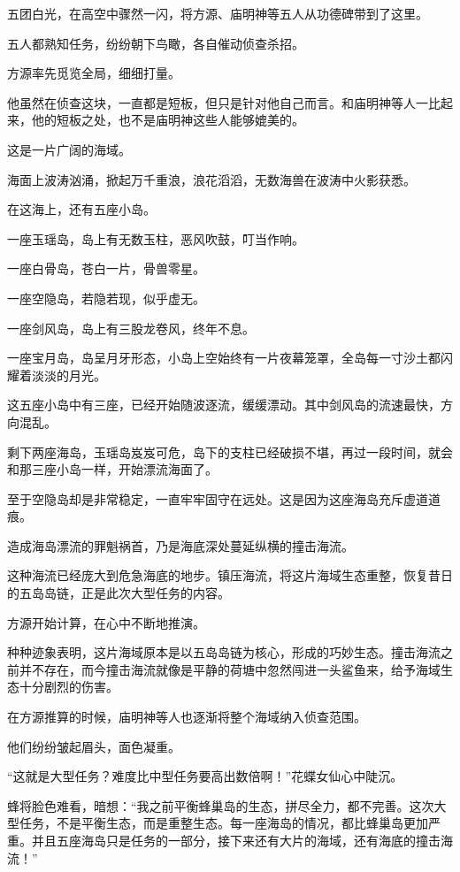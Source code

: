 
\begin{this_body}

五团白光，在高空中骤然一闪，将方源、庙明神等五人从功德碑带到了这里。

五人都熟知任务，纷纷朝下鸟瞰，各自催动侦查杀招。

方源率先觅览全局，细细打量。

他虽然在侦查这块，一直都是短板，但只是针对他自己而言。和庙明神等人一比起来，他的短板之处，也不是庙明神这些人能够媲美的。

这是一片广阔的海域。

海面上波涛汹涌，掀起万千重浪，浪花滔滔，无数海兽在波涛中火影获悉。

在这海上，还有五座小岛。

一座玉瑶岛，岛上有无数玉柱，恶风吹鼓，叮当作响。

一座白骨岛，苍白一片，骨兽零星。

一座空隐岛，若隐若现，似乎虚无。

一座剑风岛，岛上有三股龙卷风，终年不息。

一座宝月岛，岛呈月牙形态，小岛上空始终有一片夜幕笼罩，全岛每一寸沙土都闪耀着淡淡的月光。

这五座小岛中有三座，已经开始随波逐流，缓缓漂动。其中剑风岛的流速最快，方向混乱。

剩下两座海岛，玉瑶岛岌岌可危，岛下的支柱已经破损不堪，再过一段时间，就会和那三座小岛一样，开始漂流海面了。

至于空隐岛却是非常稳定，一直牢牢固守在远处。这是因为这座海岛充斥虚道道痕。

造成海岛漂流的罪魁祸首，乃是海底深处蔓延纵横的撞击海流。

这种海流已经庞大到危急海底的地步。镇压海流，将这片海域生态重整，恢复昔日的五岛岛链，正是此次大型任务的内容。

方源开始计算，在心中不断地推演。

种种迹象表明，这片海域原本是以五岛岛链为核心，形成的巧妙生态。撞击海流之前并不存在，而今撞击海流就像是平静的荷塘中忽然闯进一头鲨鱼来，给予海域生态十分剧烈的伤害。

在方源推算的时候，庙明神等人也逐渐将整个海域纳入侦查范围。

他们纷纷皱起眉头，面色凝重。

“这就是大型任务？难度比中型任务要高出数倍啊！”花蝶女仙心中陡沉。

蜂将脸色难看，暗想：“我之前平衡蜂巢岛的生态，拼尽全力，都不完善。这次大型任务，不是平衡生态，而是重整生态。每一座海岛的情况，都比蜂巢岛更加严重。并且五座海岛只是任务的一部分，接下来还有大片的海域，还有海底的撞击海流！”


\end{this_body}
